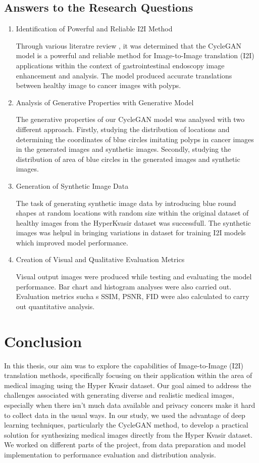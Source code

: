 \documentclass[UKenglish,12pt]{master-style}
\begin{document}
\section{Answers to the Research Questions} 
\begin{enumerate}
\item Identification of Powerful and Reliable I2I Method
    
Through various literatre review , it was determined that the CycleGAN model is a powerful and reliable method for Image-to-Image translation (I2I) applications within the context of gastrointestinal endoscopy image enhancement and analysis. The model produced accurate translations between healthy image to cancer images with polyps.

\item Analysis of Generative Properties with Generative Model

The generative properties of our CycleGAN model was analysed with two different approach. Firstly, studying the distribution of locations and determining the coordinates of blue circles imitating polyps in cancer images in the generated images and synthetic images. Secondly, studying the distribution of area of blue circles in the generated images and synthetic images. 

\item Generation of Synthetic Image Data

The task of generating synthetic image data by introducing blue round shapes at random locations with random size within the original dataset of healthy images from the HyperKvasir dataset was successfull. The synthetic images was helpul in bringing variations in dataset for training I2I models which improved model performance.

\item Creation of Visual and Qualitative Evaluation Metrics

Visual output images were produced while testing and evaluating the model performance. Bar chart and histogram analyses were also carried out. Evaluation metrics sucha s SSIM, PSNR, FID were also calculated to carry out quantitative analysis.

\end{enumerate}

\chapter{Conclusion}

In this thesis, our aim was to explore the capabilities of Image-to-Image (I2I) translation methods, specifically focusing on their application within the area of medical imaging using the Hyper Kvasir dataset. Our goal aimed to address the challenges associated with generating diverse and realistic medical images, especially when there isn't much data available and privacy concers make it hard to collect data in the usual ways. In our study, we used the advantage of deep learning techniques, particularly the CycleGAN method, to develop a practical solution for synthesizing medical images directly from the Hyper Kvasir dataset. We worked on different parts of the project, from data preparation and model implementation to performance evaluation and distribution analysis.
\end{document}
